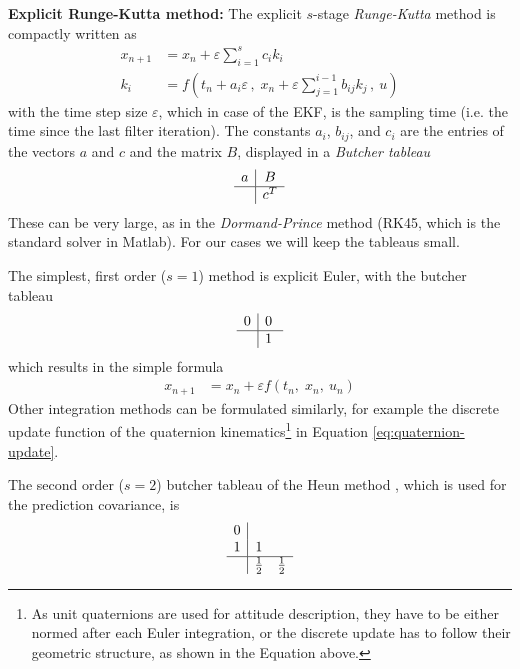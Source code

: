 \textbf{Explicit Runge-Kutta method:}
The explicit $s$-stage \textit{Runge-Kutta} method is compactly written as \cite{griffiths2010}
\begin{align}
    x_{n+1} &= x_n + \varepsilon \sum_{i=1}^{s} c_i k_i
    \\
    k_i &= f \left( t_n + a_i \varepsilon \, , \; x_n + \varepsilon \sum_{j=1}^{i-1} b_{ij} k_j \, , \ u \right) 
\end{align}
with the time step size $\varepsilon$, which in case of the EKF, is the sampling time (i.e. the time since the last filter iteration).
The constants $a_i$, $b_{ij}$, and $c_i$ are the entries of the vectors $a$ and $c$ and the matrix $B$, displayed in a \textit{Butcher tableau}
\begin{equation}
    \begin{array}{c|c}
        a & B \\
        \hline 
        & c^T
        \end{array}
    \label{eq:appendix_general_butcher}
\end{equation}
These can be very large, as in the \textit{Dormand-Prince} method (RK45, which is the standard solver in Matlab).
For our cases we will keep the tableaus small.

The simplest, first order ($s=1$) method is explicit Euler, with the butcher tableau \cite{griffiths2010}
\begin{equation}
    \begin{array}{c|cc}
        0 & 0 \;\\
        \hline 
        & 1 \;
        \end{array}
    \label{eq:appendix_euler_butcher}
\end{equation}
which results in the simple formula
\begin{align}
    x_{n+1} &= x_n + \varepsilon f \left( t_n, \; x_n, \ u_n \right)
\end{align}
Other integration methods can be formulated similarly, for example the discrete update function of the quaternion kinematics\footnote{As unit quaternions are used for attitude description, they have to be either normed after each Euler integration, or the discrete update has to follow their geometric structure, as shown in the Equation above.} in Equation \ref{eq:quaternion-update}.

The second order ($s=2$) butcher tableau of the Heun method \cite{griffiths2010}, which is used for the prediction covariance, is  
\begin{equation}
    \begin{array}{c|cc}
        0 &  &   \\
        1 & 1 &  \\
        \hline 
        & \frac{1}{2} & \frac{1}{2} 
        \end{array}
    \label{eq:appendix_heun_butcher}
\end{equation}

